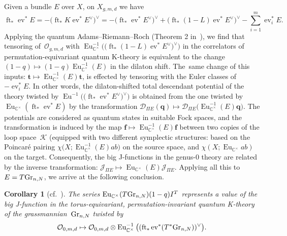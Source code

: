 \documentclass[10pt,a4paper]{amsart}
\numberwithin{equation}{section}
\newtheorem{Corollary}[Theorem]{Corollary}
\def\D{\mathcal D}
\def\K{\mathcal K}
\def\J{\mathcal J}
\def\O{\mathcal O}
\def\CC{\mathbb C}
\def\f{{\mathbf f}}
\def\t{{\mathbf t}}
\def\q{{\mathbf q}}
\def\ev{\operatorname{ev}}
\def\ft{\operatorname{ft}}
\def\Eu{\operatorname{Eu}}
\theoremstyle{definition}
\theoremstyle{plain}
\begin{document}
Given a bundle $E$ over $X$, on $X_{g,m,d}$ we have
\[
\ft_*\ev^*E=-\big(\ft_* K\ev^*E^{\vee}\big)^{\vee} = -\big(\ft_*\ev^*E^{\vee}\big)^{\vee}+\big(\ft_*(1-L)\ev^*E^{\vee}\big)^{\vee}-\sum_{i=1}^m\ev_i^*E.
\]
Applying the quantum Adams--Riemann--Roch (Theorem 2 in~\cite{Givental:perm11}), we find that tensoring of~$\O_{g,m,d}$ with $\Eu^{-1}_{\CC^{\times}}\big(\big(\ft_*(1-L)\ev^*E^{\vee}\big)^{\vee}\big)$ in the correlators of permutation-equivariant quantum K-theory is equivalent to the change $(1-q) \mapsto (1-q)\Eu_{\CC^{\times}}^{-1}(E)$ in the dilaton shift. The~same change of this inputs: $\t \mapsto \Eu^{-1}_{\CC^{\times}}(E)\t$, is effected by tensoring with the Euler classes of~$-\ev_i^*E$. In other words, the dilaton-shifted total descendant potential of the theory twisted by $\Eu^{-1}\big(\big(\ft_*\ev^*E^{\vee}\big)^{\vee}\big)$ is obtained from the one twisted by $\Eu_{\CC^{\times}}(\ft_*\ev^*E)$ by the transformation $\D_{\Pi E}(\q) \mapsto \D_{\Pi E} \big(\Eu^{-1}_{\CC^{\times}}(E)\q\big)$. The potentials are considered as quantum states in suitable Fock spaces, and the transformation is induced by the map $\f \mapsto \Eu^{-1}_{\CC^{\times}}(E)\f$ between two copies of the loop space~$\K$ (equipped with two different symplectic structures: based on the Poincar\'e pairing $\chi \big(X; \Eu_{\CC^{\times}}^{-1}(E) ab\big)$ on the source space, and $\chi (X;\Eu_{\CC^{\times}}ab)$ on the target. Consequently, the big \mbox{J-functions} in the genus-$0$ theory are related by the inverse transformation: $\J_{\Pi E}\mapsto \Eu_{\CC^{\times}}(E)\J_{\Pi E}$. Applying all this to $E=T{\rm Gr}_{n,N}$, we arrive at the following conclusion.

\begin{Corollary}[{cf.~\cite{Liu}}] \label{cor2}
The series $\Eu_{\CC^{\times}}(T{\rm Gr}_{n,N})(1-q)I^T$ represents a value of the big J-func\-tion in the torus-equivariant, permutation-invariant quantum K-theory of the grassmannian~${\rm Gr}_{n,N}$ twisted by
\[
\O_{0,m,d}\mapsto \O_{0,m,d}\otimes \Eu^{-1}_{\CC^{\times}}\big((\ft_*\ev^*(T^*{\rm Gr}_{n,N}))^{\vee}\big).
\]
\end{Corollary}
\end{document}
